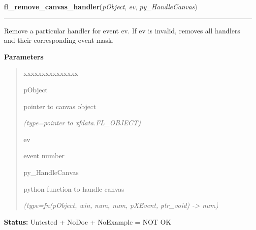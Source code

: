 \hspace{.8\funcindent}\begin{boxedminipage}{\funcwidth}

    \raggedright \textbf{fl\_remove\_canvas\_handler}(\textit{pObject}, \textit{ev}, \textit{py\_HandleCanvas})

    \vspace{-1.5ex}

    \rule{\textwidth}{0.5\fboxrule}
\setlength{\parskip}{2ex}
    Remove a particular handler for event ev. If ev is invalid, removes all
    handlers and their corresponding event mask.

\setlength{\parskip}{1ex}
      \textbf{Parameters}
      \vspace{-1ex}

      \begin{quote}
        \begin{Ventry}{xxxxxxxxxxxxxxx}

          \item[pObject]

          pointer to canvas object

            {\it (type=pointer to xfdata.FL\_OBJECT)}

          \item[ev]

          event number

          \item[py\_HandleCanvas]

          python function to handle canvas

            {\it (type=fn(pObject, win, num, num, pXEvent, ptr\_void) -{\textgreater} num)}

        \end{Ventry}

      \end{quote}

\textbf{Status:} Untested + NoDoc + NoExample = NOT OK



    \end{boxedminipage}

    \label{xformslib:library:fl_hide_canvas}

    \vspace{0.5ex}

